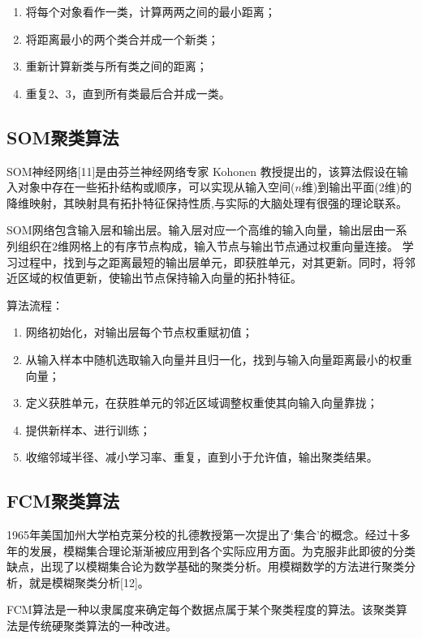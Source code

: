 \begin{enumerate}\itemsep0em
		\item 将每个对象看作一类，计算两两之间的最小距离；
		\item 将距离最小的两个类合并成一个新类；
		\item 重新计算新类与所有类之间的距离；
		\item 重复2、3，直到所有类最后合并成一类。
\end{enumerate}

\subsection{SOM聚类算法}

SOM神经网络[11]是由芬兰神经网络专家 Kohonen 教授提出的，该算法假设在输入对象中存在一些拓扑结构或顺序，可以实现从输入空间($n$维)到输出平面($2$维)的降维映射，其映射具有拓扑特征保持性质,与实际的大脑处理有很强的理论联系。

SOM网络包含输入层和输出层。输入层对应一个高维的输入向量，输出层由一系列组织在$2$维网格上的有序节点构成，输入节点与输出节点通过权重向量连接。 学习过程中，找到与之距离最短的输出层单元，即获胜单元，对其更新。同时，将邻近区域的权值更新，使输出节点保持输入向量的拓扑特征。

算法流程：

\begin{enumerate}\itemsep0em
		\item 网络初始化，对输出层每个节点权重赋初值；
		\item 从输入样本中随机选取输入向量并且归一化，找到与输入向量距离最小的权重向量；
		\item 定义获胜单元，在获胜单元的邻近区域调整权重使其向输入向量靠拢；
		\item 提供新样本、进行训练；
		\item 收缩邻域半径、减小学习率、重复，直到小于允许值，输出聚类结果。
\end{enumerate}

\subsection{FCM聚类算法}

1965年美国加州大学柏克莱分校的扎德教授第一次提出了‘集合’的概念。经过十多年的发展，模糊集合理论渐渐被应用到各个实际应用方面。为克服非此即彼的分类缺点，出现了以模糊集合论为数学基础的聚类分析。用模糊数学的方法进行聚类分析，就是模糊聚类分析[12]。

FCM算法是一种以隶属度来确定每个数据点属于某个聚类程度的算法。该聚类算法是传统硬聚类算法的一种改进。

